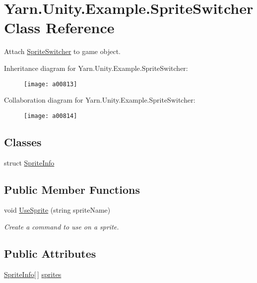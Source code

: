 \hypertarget{a00163}{\section{Yarn.\-Unity.\-Example.\-Sprite\-Switcher Class Reference}
\label{a00163}
}


Attach \hyperlink{a00163}{Sprite\-Switcher} to game object.  




Inheritance diagram for Yarn.\-Unity.\-Example.\-Sprite\-Switcher\-:
\nopagebreak
\begin{figure}[H]
\begin{center}
\leavevmode
\texttt{[image: a00813]}
\end{center}
\end{figure}


Collaboration diagram for Yarn.\-Unity.\-Example.\-Sprite\-Switcher\-:
\nopagebreak
\begin{figure}[H]
\begin{center}
\leavevmode
\texttt{[image: a00814]}
\end{center}
\end{figure}
\subsection*{Classes}
\begin{DoxyCompactItemize}
\item 
struct \hyperlink{a00163_a00382}{Sprite\-Info}
\end{DoxyCompactItemize}
\subsection*{Public Member Functions}
\begin{DoxyCompactItemize}
\item 
void \hyperlink{a00163_ac26718b713f342f3de8f3e569c5b62da}{Use\-Sprite} (string sprite\-Name)
\begin{DoxyCompactList}\small\item\em Create a command to use on a sprite. \end{DoxyCompactList}\end{DoxyCompactItemize}
\subsection*{Public Attributes}
\begin{DoxyCompactItemize}
\item 
\hyperlink{a00163_a00382}{Sprite\-Info}\mbox{[}$\,$\mbox{]} \hyperlink{a00163_a1e85d9f4f6b33ca7ae638cce2eb704aa}{sprites}
\end{DoxyCompactItemize}


